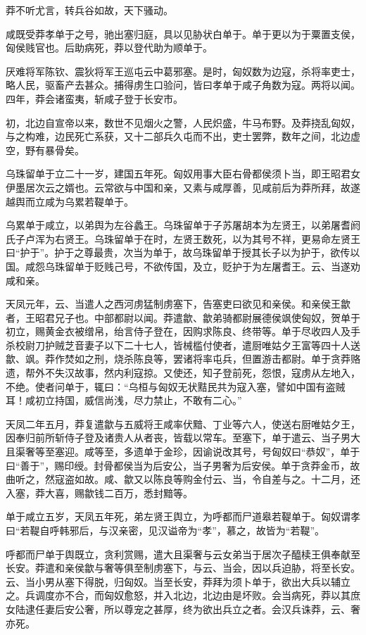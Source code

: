 \documentclass[]{article}
\begin{document}
莽不听尤言，转兵谷如故，天下骚动。

咸既受莽孝单于之号，驰出塞归庭，具以见胁状白单于。单于更以为于粟置支侯，匈侯贱官也。后助病死，莽以登代助为顺单于。

厌难将军陈钦、震狄将军王巡屯云中葛邪塞。是时，匈奴数为边寇，杀将率吏士，略人民，驱畜产去甚众。捕得虏生口验问，皆曰孝单于咸子角数为寇。两将以闻。四年，莽会诸蛮夷，斩咸子登于长安市。

初，北边自宣帝以来，数世不见烟火之警，人民炽盛，牛马布野。及莽挠乱匈奴，与之构难，边民死亡系获，又十二部兵久屯而不出，吏士罢弊，数年之间，北边虚空，野有暴骨矣。

乌珠留单于立二十一岁，建国五年死。匈奴用事大臣右骨都侯须卜当，即王昭君女伊墨居次云之婿也。云常欲与中国和亲，又素与咸厚善，见咸前后为莽所拜，故遂越舆而立咸为乌累若鞮单于。

乌累单于咸立，以弟舆为左谷蠡王。乌珠留单于子苏屠胡本为左贤王，以弟屠耆阏氏子卢浑为右贤王。乌珠留单于在时，左贤王数死，以为其号不祥，更易命左贤王曰``护于''。护于之尊最贵，次当为单于，故乌珠留单于授其长子以为护于，欲传以国。咸怨乌珠留单于贬贱己号，不欲传国，及立，贬护于为左屠耆王。云、当遂劝咸和亲。

天凤元年，云、当遣人之西河虏猛制虏塞下，告塞吏曰欲见和亲侯。和亲侯王歙者，王昭君兄子也。中部都尉以闻。莽遣歙、歙弟骑都尉展德侯飒使匈奴，贺单于初立，赐黄金衣被缯帛，绐言侍子登在，因购求陈良、终带等。单于尽收四人及手杀校尉刀护贼芝音妻子以下二十七人，皆械槛付使者，遣厨唯姑夕王富等四十人送歙、飒。莽作焚如之刑，烧杀陈良等，罢诸将率屯兵，但置游击都尉。单于贪莽赂遗，帮外不失汉故事，然内利寇掠。又使还，知子登前死，怨恨，寇虏从左地入，不绝。使者问单于，辄曰：``乌桓与匈奴无状黠民共为寇入塞，譬如中国有盗贼耳！咸初立持国，威信尚浅，尽力禁止，不敢有二心。''

天凤二年五月，莽复遣歙与五威将王咸率伏黯、丁业等六人，使送右厨唯姑夕王，因奉归前所斩侍子登及诸贵人从者丧，皆载以常车。至塞下，单于遣云、当子男大且渠奢等至塞迎。咸等至，多遗单于金珍，因谕说改其号，号匈奴曰``恭奴''，单于曰``善于''，赐印绶。封骨都侯当为后安公，当子男奢为后安侯。单于贪莽金币，故曲听之，然寇盗如故。咸、歙又以陈良等购金付云、当，令自差与之。十二月，还入塞，莽大喜，赐歙钱二百万，悉封黯等。

单于咸立五岁，天凤五年死，弟左贤王舆立，为呼都而尸道皋若鞮单于。匈奴谓孝曰``若鞮自呼韩邪后，与汉亲密，见汉谥帝为``孝''，慕之，故皆为``若鞮''。

呼都而尸单于舆既立，贪利赏赐，遣大且渠奢与云女弟当于居次子醯椟王俱奉献至长安。莽遣和亲侯歙与奢等俱至制虏塞下，与云、当会，因以兵迫胁，将至长安。云、当小男从塞下得脱，归匈奴。当至长安，莽拜为须卜单于，欲出大兵以辅立之。兵调度亦不合，而匈奴愈怒，并入北边，北边由是坏败。会当病死，莽以其庶女陆逮任妻后安公奢，所以尊宠之甚厚，终为欲出兵立之者。会汉兵诛莽，云、奢亦死。
\end{document}
